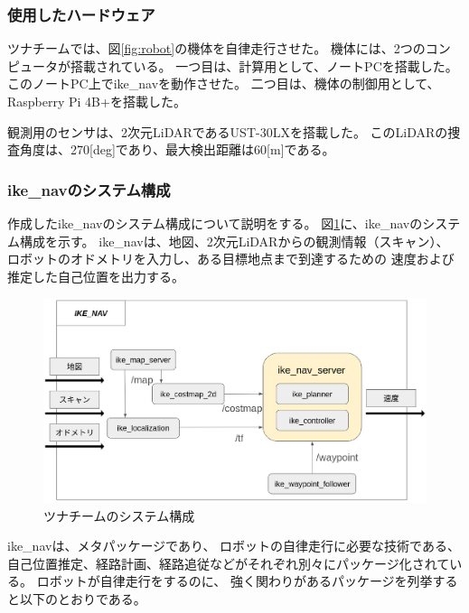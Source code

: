 \documentclass[twocolumn,9pt]{jsproceedings}
\begin{document}
\subsubsection{使用したハードウェア}
ツナチームでは、図\ref{fig:robot}の機体を自律走行させた。
機体には、2つのコンピュータが搭載されている。
一つ目は、計算用として、ノートPCを搭載した。
このノートPC上でike\_navを動作させた。
二つ目は、機体の制御用として、Raspberry Pi 4B+を搭載した。

観測用のセンサは、2次元LiDARであるUST-30LX\cite{UST-30LX}を搭載した。
このLiDARの捜査角度は、270[deg]であり、最大検出距離は60[m]である。


\subsubsection{ike\_navのシステム構成}

作成したike\_navのシステム構成について説明をする。
図\ref{fig:tuna_system}に、ike\_navのシステム構成を示す。
ike\_navは、地図、2次元LiDARからの観測情報（スキャン）、
ロボットのオドメトリを入力し、ある目標地点まで到達するための
速度および推定した自己位置を出力する。

\begin{figure}[h]
  \begin{center}
    \includegraphics[width=1.0\linewidth]{figs/ike_nav.pdf}
    \caption{ツナチームのシステム構成}
    \label{fig:tuna_system}
  \end{center}
\end{figure}

ike\_navは、メタパッケージであり、
ロボットの自律走行に必要な技術である、
自己位置推定、経路計画、経路追従などがそれぞれ別々にパッケージ化されている。
ロボットが自律走行をするのに、
強く関わりがあるパッケージを列挙すると以下のとおりである。
\end{document}
